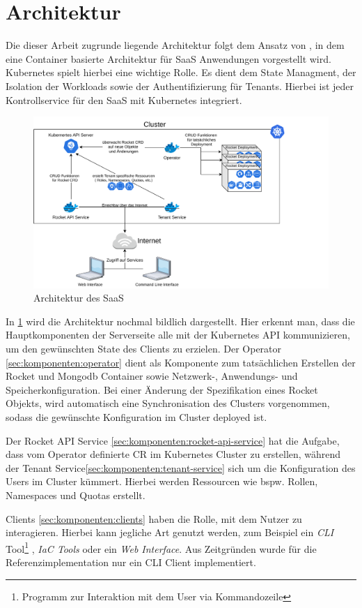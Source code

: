 \section{Architektur}
\label{sec:komponenten:architektur}

Die dieser Arbeit zugrunde liegende Architektur folgt dem Ansatz von \cite{Truyen2016}, in dem eine Container basierte
Architektur für \ac{SaaS} Anwendungen vorgestellt wird. Kubernetes spielt hierbei eine wichtige Rolle. Es dient dem State
Managment, der Isolation der Workloads sowie der Authentifizierung für Tenants. Hierbei ist jeder Kontrollservice für den \ac{SaaS}
mit Kubernetes integriert.

\begin{figure}[h]
  \includegraphics[width=45em]{gfx/chapters/3_komponenten/saas_architecture.pdf}
  \caption{Architektur des \ac{SaaS}}
  \label{fig:architektur}
\end{figure}

In \ref{fig:architektur} wird die Architektur nochmal bildlich dargestellt.
Hier erkennt man, dass die Hauptkomponenten der Serverseite alle mit der Kubernetes API kommunizieren,
um den gewünschten State des Clients zu erzielen. Der Operator \ref{sec:komponenten:operator} dient als Komponente zum tatsächlichen
Erstellen der Rocket und Mongodb Container sowie Netzwerk-, Anwendungs- und Speicherkonfiguration.
Bei einer Änderung der Spezifikation eines Rocket Objekts, wird automatisch eine Synchronisation des 
Clusters vorgenommen, sodass die gewünschte Konfiguration im Cluster deployed ist.

Der Rocket API Service \ref{sec:komponenten:rocket-api-service} hat die Aufgabe, 
dass vom Operator definierte \ac{CR} im Kubernetes Cluster zu erstellen, während der Tenant Service\ref{sec:komponenten:tenant-service}
sich um die Konfiguration des Users im Cluster kümmert.
Hierbei werden Ressourcen wie bspw. Rollen, Namespaces und Quotas erstellt.

Clients \ref{sec:komponenten:clients} haben die Rolle, mit dem Nutzer zu interagieren. Hierbei kann jegliche Art genutzt werden,
zum Beispiel ein \emph{\ac{CLI}} Tool\footnote{Programm zur Interaktion mit dem User via Kommandozeile}
, \emph{\ac{IaC} Tools} oder ein \emph{Web Interface}. Aus Zeitgründen wurde für die Referenzimplementation nur
ein \ac{CLI} Client implementiert.
